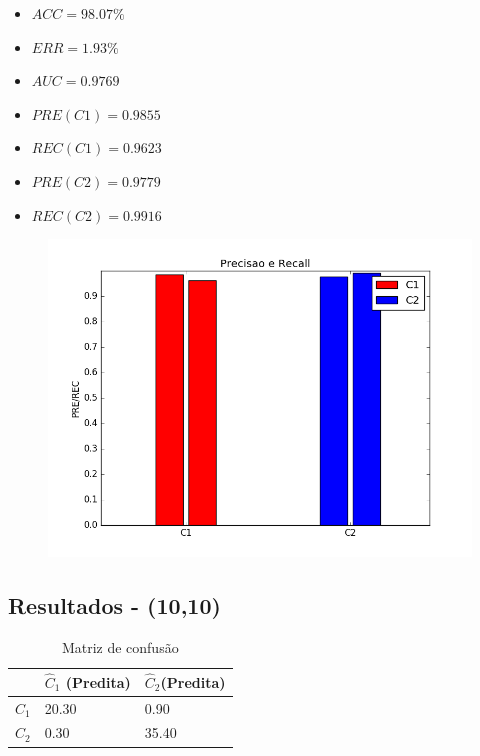 \documentclass[11pt,a4paper]{article}
\numberwithin{equation}{section}
\begin{document}
\begin{minipage}{.5\textwidth}
\begin{itemize}
\item $ACC = 98.07 \%$
\item $ERR =  1.93 \%$
\item $AUC = 0.9769  $
\item $PRE(C1) = 0.9855$
\item $REC(C1) = 0.9623$
\item $PRE(C2) = 0.9779$
\item $REC(C2) = 0.9916$
\end{itemize}
\end{minipage}%
\begin{minipage}{.5\textwidth}
\begin{figure}[H]
\centering
  \includegraphics[width=\linewidth]{../img/mlp_100.png}
  \label{fig:percep}
\end{figure}
\end{minipage}%

\subsection{Resultados - (10,10)}
\begin{table}[H]
\centering
\caption{Matriz de confusão}
\begin{tabular}{l l l}
\hline
 & \textbf{$\hat{C}_1$ (Predita)} & \textbf{$\hat{C}_2$(Predita)}\\
\hline
$C_1$ & 20.30 & 0.90 \\
$C_2$ & 0.30  & 35.40\\ 
\hline
\end{tabular}
\end{table}
\end{document}
